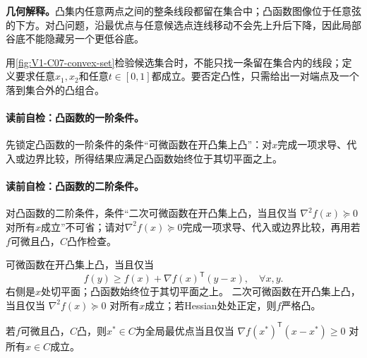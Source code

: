 \label{struct:V1-C07-CH10}
\label{struct:V1-C07-CH21}
\label{struct:V1-C07-CH22}
\label{struct:V1-C07-CH23}
\label{struct:V1-C07-CH24}
\label{struct:V1-C07-CH25}
\label{struct:V1-C07-CH26}
\label{struct:V1-C07-CH27}
\begin{geometrybox}
\textbf{几何解释。}凸集内任意两点之间的整条线段都留在集合中；凸函数图像位于任意弦的下方。对凸问题，沿最优点与任意候选点连线移动不会先上升后下降，因此局部谷底不能隐藏另一个更低谷底。
\end{geometrybox}

\label{struct:V1-C07-CH19}

用\cref{fig:V1-C07-convex-set}检验候选集合时，不能只找一条留在集合内的线段；定义要求任意$x_1,x_2$和任意$t\in[0,1]$都成立。要否定凸性，只需给出一对端点及一个落到集合外的凸组合。


\paragraph{读前自检：凸函数的一阶条件。}先锁定凸函数的一阶条件的条件“可微函数在开凸集上凸”：对$x$完成一项求导、代入或边界比较，所得结果应满足凸函数始终位于其切平面之上。\par
\paragraph{读前自检：凸函数的二阶条件。}对凸函数的二阶条件，条件“二次可微函数在开凸集上凸，当且仅当 $\nabla^2f(x)\succeq0$ 对所有$x$成立”不可省；请对$\nabla^2f(x)\succeq0$完成一项求导、代入或边界比较，再用若$f$可微且凸，$C$凸作检查。\par

可微函数在开凸集上凸，当且仅当
\[
f(y)\ge f(x)+\nabla f(x)^{\mathsf T}(y-x),\quad \forall x,y.
\]
右侧是$x$处切平面；凸函数始终位于其切平面之上。
二次可微函数在开凸集上凸，当且仅当 $\nabla^2f(x)\succeq0$ 对所有$x$成立；若Hessian处处正定，则$f$严格凸。

\label{struct:V1-C07-CH12}
\begin{theorem}[凸问题的一阶最优条件]
若$f$可微且凸，$C$凸，则$x^*\in C$为全局最优点当且仅当
$\nabla f(x^*)^{\mathsf T}(x-x^*)\ge0$ 对所有$x\in C$成立。
\end{theorem}
\label{struct:V1-C07-CH15}
